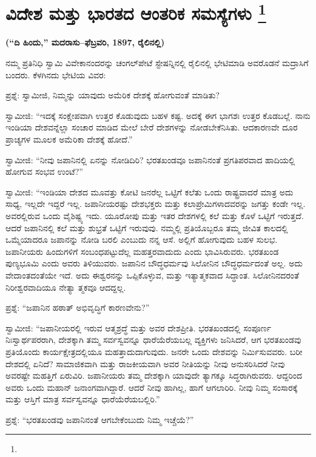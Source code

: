
\chapter[ವಿದೇಶ ಮತ್ತು ಭಾರತದ ಆಂತರಿಕ ಸಮಸ್ಯೆಗಳು ]{ವಿದೇಶ ಮತ್ತು ಭಾರತದ ಆಂತರಿಕ ಸಮಸ್ಯೆಗಳು \protect\footnote{}}

\centerline{\textbf{(“ದಿ ಹಿಂದು,” ಮದರಾಸು–ಫೆಬ್ರವರಿ, 1897, ರೈಲಿನಲ್ಲಿ)}}

ನಮ್ಮ ಪ್ರತಿನಿಧಿ ಸ್ವಾಮಿ ವಿವೇಕಾನಂದರನ್ನು ಚಂಗಲ್​ಪೇಟೆ ಸ್ಟೇಷನ್ನಿನಲ್ಲಿ ರೈಲಿನಲ್ಲಿ ಭೇಟಿಮಾಡಿ ಅವರೊಡನೆ ಮದ್ರಾಸಿಗೆ ಬಂದರು. ಕೆಳಗಿನದು ಭೇಟಿಯ ವಿವರ:

ಪ್ರಶ್ನೆ: ಸ್ವಾಮೀಜಿ, ನಿಮ್ಮನ್ನು ಯಾವುದು ಅಮೆರಿಕ ದೇಶಕ್ಕೆ ಹೋಗುವಂತೆ ಮಾಡಿತು?

ಸ್ವಾಮೀಜಿ: “ಇದಕ್ಕೆ ಸಂಕ್ಷೇಪವಾಗಿ ಉತ್ತರ ಕೊಡುವುದು ಬಹಳ ಕಷ್ಟ. ಅದಕ್ಕೆ ಈಗ ಭಾಗಶಃ ಉತ್ತರ ಕೊಡಬಲ್ಲೆ. ನಾನು ಇಂಡಿಯಾ ದೇಶವನ್ನೆಲ್ಲಾ ಸಂಚಾರ ಮಾಡಿದ ಮೇಲೆ ಬೇರೆ ದೇಶಗಳನ್ನು ನೋಡಬೇಕೆನಿಸಿತು. ಆದಕಾರಣವೇ ದೂರ ಪ್ರಾಚ್ಯಗಳ ಮೂಲಕ ಅಮೆರಿಕಾ ದೇಶಕ್ಕೆ ಹೋದೆ.”

ಸ್ವಾಮೀಜಿ: “ನೀವು ಜಪಾನಿನಲ್ಲಿ ಏನನ್ನು ನೋಡಿದಿರಿ? ಭರತಖಂಡವೂ ಜಪಾನಿನಂತೆ ಪ್ರಗತಿಪರವಾದ ಹಾದಿಯಲ್ಲಿ ಹೋಗುವ ಸಂಭವ ಉಂಟೆ?”

ಸ್ವಾಮೀಜಿ: “ಇಂಡಿಯಾ ದೇಶದ ಮೂವತ್ತು ಕೋಟಿ ಜನರೆಲ್ಲ ಒಟ್ಟಿಗೆ ಕಲೆತು ಒಂದು ರಾಷ್ಟ್ರವಾದರೆ ಮಾತ್ರ ಅದು ಸಾಧ್ಯ, ಇಲ್ಲದೇ ಇದ್ದರೆ ಇಲ್ಲ. ಜಪಾನೀಯರಷ್ಟು ದೇಶಭಕ್ತರು ಮತ್ತು ಕಲಾಪ್ರೇಮಿಗಳಾದವರನ್ನು ಜಗತ್ತು ಕಂಡೇ ಇಲ್ಲ. ಅವರಲ್ಲಿರುವ ಒಂದು ವೈಶಿಷ್ಟ್ಯ ಇದು. ಯೂರೋಪು ಮತ್ತು ಇತರ ದೇಶಗಳಲ್ಲಿ ಕಲೆ ಮತ್ತು ಕೊಳೆ ಒಟ್ಟಿಗೆ ಇರುತ್ತದೆ. ಆದರೆ ಜಪಾನಿನಲ್ಲಿ ಕಲೆ ಮತ್ತು ಶುಭ್ರತೆ ಒಟ್ಟಿಗೆ ಇರುವುವು. ನಮ್ಮಲ್ಲಿ ಪ್ರತಿಯೊಬ್ಬರೂ ತಮ್ಮ ಜೀವಿತ ಕಾಲದಲ್ಲಿ ಒಮ್ಮೆಯಾದರೂ ಜಪಾನನ್ನು ನೋಡಿ ಬರಲಿ ಎಂಬುದು ನನ್ನ ಆಸೆ. ಅಲ್ಲಿಗೆ ಹೋಗುವುದು ಬಹಳ ಸುಲಭ. ಜಪಾನೀಯರು ಹಿಂದುಗಳಿಗೆ ಸಂಬಂಧಪಟ್ಟುದೆಲ್ಲ ಮಹತ್ತರವಾದುದು ಎಂದು ಭಾವಿಸಿರುವರು. ಭರತಖಂಡ ಪುಣ್ಯಭೂಮಿ ಎಂದು ಅವರು ತಿಳಿಯುವರು. ಜಪಾನಿನ ಬೌದ್ಧಧರ್ಮವು ಸಿಲೋನಿನ ಬೌದ್ಧಧರ್ಮದಂತೆ ಅಲ್ಲ. ಅದು ವೇದಾಂತದಂತೆಯೇ ಇದೆ. ಅದು ಈಶ್ವರನನ್ನು ಒಪ್ಪಿಕೊಳ್ಳುವ, ಮತ್ತು ಇತ್ಯಾತ್ಮಕವಾದ ಸಿದ್ಧಾಂತ. ಸಿಲೋನಿನದರಂತೆ ನಿರೀಶ್ವರವಾದಿಯೂ ನೇತ್ಯಾ ತ್ಮಕವೂ ಆದದ್ದಲ್ಲ.

ಪ್ರಶ್ನೆ: “ಜಪಾನಿನ ಹಠಾತ್​ ಅಭಿವೃದ್ಧಿಗೆ ಕಾರಣವೇನು?”

ಸ್ವಾಮೀಜಿ: “ಜಪಾನೀಯರಲ್ಲಿ ಇರುವ ಆತ್ಮಶ್ರದ್ಧೆ ಮತ್ತು ಅವರ ದೇಶಪ್ರೀತಿ. ಭರತಖಂಡದಲ್ಲಿ ಸಂಪೂರ್ಣ ನಿಃಸ್ವಾರ್ಥಪರರಾಗಿ, ದೇಶಕ್ಕಾಗಿ ತಮ್ಮ ಸರ್ವಸ್ವವನ್ನೂ ಧಾರೆಯೆರೆಯಬಲ್ಲ ವ್ಯಕ್ತಿಗಳು ಜನಿಸಿದರೆ, ಆಗ ಭರತಖಂಡವು ಪ್ರತಿಯೊಂದು ಕಾರ್ಯಕ್ಷೇತ್ರದಲ್ಲಿಯೂ ಮಹತ್ತಾದುದಾಗುವುದು. ಜನರೇ ಒಂದು ದೇಶವನ್ನು ನಿರ್ಮಿಸುವವರು. ಬರೀ ದೇಶದಲ್ಲಿ ಏನಿದೆ? ಸಾಮಾಜಿಕವಾಗಿ ಮತ್ತು ರಾಜಕೀಯವಾಗಿ ಅವರ ನೀತಿಯನ್ನು ನೀವು ಅನುಸರಿಸಿದರೆ ನೀವು ಅವರಷ್ಟೇ ಮಹತ್ತಿಗೆ ಏರುವಿರಿ. ಜಪಾನೀಯರು ತಮ್ಮ ದೇಶಕ್ಕಾಗಿ ಯಾವುದೇ ತ್ಯಾಗಕ್ಕೂ ಸಿದ್ಧರಾಗಿರುವರು. ಆದ್ದರಿಂದ ಅವರು ಒಂದು ಮಹಾನ್​ ಜನಾಂಗವಾಗಿದ್ದಾರೆ. ಆದರೆ ನೀವು ಹಾಗಿಲ್ಲ, ಹಾಗೆ ಆಗಲಾರಿರಿ. ನೀವು ನಿಮ್ಮ ಸಂಸಾರಕ್ಕೆ ಮತ್ತು ಆಸ್ತಿಗೆ ಮಾತ್ರ ಸರ್ವಸ್ವವನ್ನೂ ಧಾರೆಯೆರೆಯಬಲ್ಲಿರಿ.”

ಪ್ರಶ್ನೆ: “ಭರತಖಂಡವು ಜಪಾನಿನಂತೆ ಆಗಬೇಕೆಂಬುದು ನಿಮ್ಮ ಇಚ್ಚೆಯೆ?”

